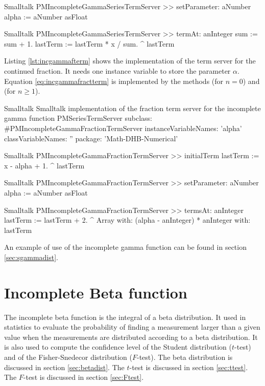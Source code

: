 \begin{displaycode}{Smalltalk}
PMIncompleteGammaSeriesTermServer >> setParameter: aNumber
    alpha := aNumber asFloat
\end{displaycode}

\begin{displaycode}{Smalltalk}
PMIncompleteGammaSeriesTermServer >> termAt: anInteger
  sum := sum + 1.
    lastTerm := lastTerm * x / sum.
    ^ lastTerm
\end{displaycode}

Listing \ref{lst:incgammafterm} shows the implementation of the
term server for the continued fraction.
It needs one instance variable to store the parameter $\alpha$.
Equation \ref{eq:incgammafractterm} is implemented by the methods   (for $n=0$) and  (for $n\ge 1$).

\begin{listing}[label=lst:incgammafterm]{Smalltalk}
{Smalltalk implementation of the fraction term server for the incomplete gamma function}
PMSeriesTermServer subclass: #PMIncompleteGammaFractionTermServer
   instanceVariableNames: 'alpha'
   classVariableNames: ''
   package: 'Math-DHB-Numerical'
\end{listing}

\begin{displaycode}{Smalltalk}
PMIncompleteGammaFractionTermServer >> initialTerm
    lastTerm := x - alpha + 1.
    ^ lastTerm
\end{displaycode}

\begin{displaycode}{Smalltalk}
PMIncompleteGammaFractionTermServer >> setParameter: aNumber
    alpha := aNumber asFloat
\end{displaycode}

\begin{displaycode}{Smalltalk}
PMIncompleteGammaFractionTermServer >> termsAt: anInteger
    lastTerm := lastTerm + 2.
    ^ Array with: (alpha - anInteger) * anInteger with: lastTerm
\end{displaycode}

An example of use of the incomplete gamma function can be found in
section \ref{sec:sgammadist}.

\section{Incomplete Beta function}
\label{sec:incbeta} The incomplete beta function is the integral
of a beta distribution.
It used in statistics to evaluate the probability of finding a measurement larger than a given value
when the measurements are distributed according to a beta
distribution.
It is also used to compute the confidence level of the Student distribution ($t$-test) and of the Fisher-Snedecor distribution ($F$-test).
The beta distribution is discussed in section \ref{sec:betadist}.
The $t$-test is discussed in section \ref{sec:ttest}.
The $F$-test is discussed in section \ref{sec:Ftest}.


